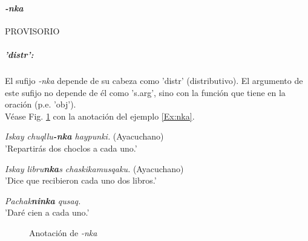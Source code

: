 \documentclass[a4paper,11pt,DIV12]{scrartcl}
\begin{document}
\paragraph{{\em -nka}}
PROVISORIO
\subparagraph{'distr':}  El sufijo {\em -nka} depende de su cabeza como 'distr' (distributivo). El argumento de este sufijo no depende de \'el como 's.arg', sino con la funci\'on que tiene en la oraci\'on (p.e. 'obj').\\
V\'ease Fig. \ref{Fig:nka} con la anotaci\'on del ejemplo \ref{Ex:nka}.

\begin{examples}
 \item {\em Iskay chuqllu\textbf{-nka} haypunki.} (Ayacuchano)\\
      'Repartir\'as dos choclos a cada uno.'\\
              \hfill{\small \citep[381]{Soto06}}
 \item {\em Iskay libru\textbf{nka}s chaskikamusqaku.} (Ayacuchano)\\
      'Dice que recibieron cada uno dos libros.'
 \item\label{Ex:nka} {\em Pachak\textbf{ninka} qusaq.}\\
      'Dar\'e cien a cada uno.'\\
              \hfill{\small \citep[82]{Soto76a}}
\end{examples}


\begin{figure}
\begin{center}
 \caption{Anotaci\'on de {\em -nka}}\label{Fig:nka}
\end{center}
\end{figure}
\end{document}
